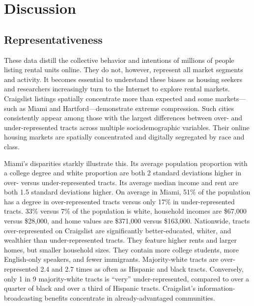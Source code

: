 \documentclass[11pt,letterpaper]{article}
\begin{document}
\section{Discussion}

\subsection{Representativeness}

These data distill the collective behavior and intentions of millions of people listing rental units online. They do not, however, represent all market segments and activity. It becomes essential to understand these biases as housing seekers and researchers increasingly turn to the Internet to explore rental markets. Craigslist listings spatially concentrate more than expected and some markets---such as Miami and Hartford---demonstrate extreme compression. Such cities consistently appear among those with the largest differences between over- and under-represented tracts across multiple sociodemographic variables. Their online housing markets are spatially concentrated and digitally segregated by race and class.

Miami's disparities starkly illustrate this. Its average population proportion with a college degree and white proportion are both 2 standard deviations higher in over- versus under-represented tracts. Its average median income and rent are both 1.5 standard deviations higher. On average in Miami, 51\% of the population has a degree in over-represented tracts versus only 17\% in under-represented tracts. 33\% versus 7\% of the population is white, household incomes are \$67,000 versus \$28,000, and home values are \$371,000 versus \$163,000. Nationwide, tracts over-represented on Craigslist are significantly better-educated, whiter, and wealthier than under-represented tracts. They feature higher rents and larger homes, but smaller household sizes. They contain more college students, more English-only speakers, and fewer immigrants. Majority-white tracts are over-represented 2.4 and 2.7 times as often as Hispanic and black tracts. Conversely, only 1 in 9 majority-white tracts is \enquote{very} under-represented, compared to over a quarter of black and over a third of Hispanic tracts. Craigslist's information-broadcasting benefits concentrate in already-advantaged communities.
\end{document}

